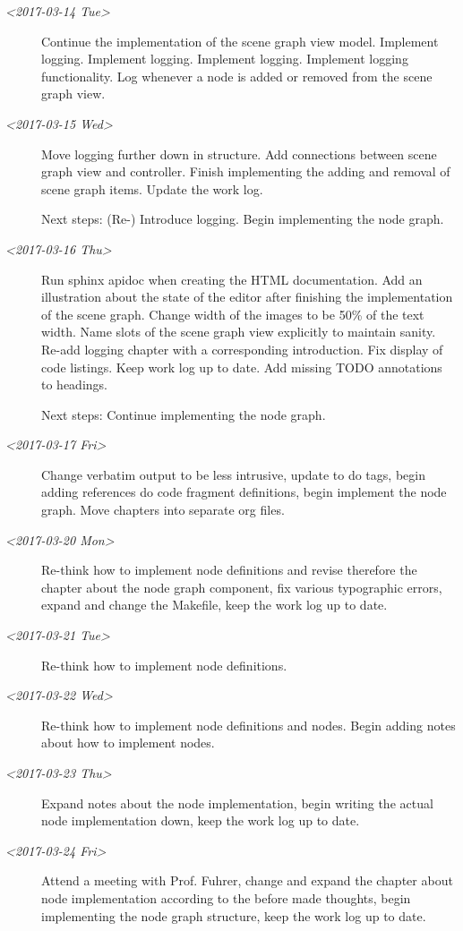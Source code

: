 \documentclass[10pt, openright, notitlepage]{scrreprt}
\begin{document}
\begin{description}
\item[{\textit{<2017-03-14 Tue>}}] Continue the implementation of the scene graph view model.
Implement logging. Implement logging. Implement logging. Implement logging
functionality. Log whenever a node is added or removed from the scene graph
view.

\item[{\textit{<2017-03-15 Wed>}}] Move logging further down in structure. Add connections
between scene graph view and controller. Finish implementing the adding and
removal of scene graph items. Update the work log.

Next steps: (Re-) Introduce logging. Begin implementing the node graph.

\item[{\textit{<2017-03-16 Thu>}}] Run sphinx apidoc when creating the HTML documentation.
Add an illustration about the state of the editor after finishing the
implementation of the scene graph. Change width of the images to be 50\% of
the text width. Name slots of the scene graph view explicitly to maintain
sanity. Re-add logging chapter with a corresponding introduction. Fix display
of code listings. Keep work log up to date. Add missing TODO annotations to
headings.

Next steps: Continue implementing the node graph.

\item[{\textit{<2017-03-17 Fri>}}] Change verbatim output to be less intrusive, update to do
tags, begin adding references do code fragment definitions, begin implement
the node graph. Move chapters into separate org files.

\item[{\textit{<2017-03-20 Mon>}}] Re-think how to implement node definitions and revise
therefore the chapter about the node graph component, fix various
typographic errors, expand and change the Makefile, keep the work log up
to date.

\item[{\textit{<2017-03-21 Tue>}}] Re-think how to implement node definitions.

\item[{\textit{<2017-03-22 Wed>}}] Re-think how to implement node definitions and nodes. Begin adding
notes about how to implement nodes.

\item[{\textit{<2017-03-23 Thu>}}] Expand notes about the node implementation, begin writing
the actual node implementation down, keep the work log up to date.

\item[{\textit{<2017-03-24 Fri>}}] Attend a meeting with Prof. Fuhrer, change and expand the
chapter about node implementation according to the before made thoughts,
begin implementing the node graph structure, keep the work log up to date.
\end{description}
\end{document}
